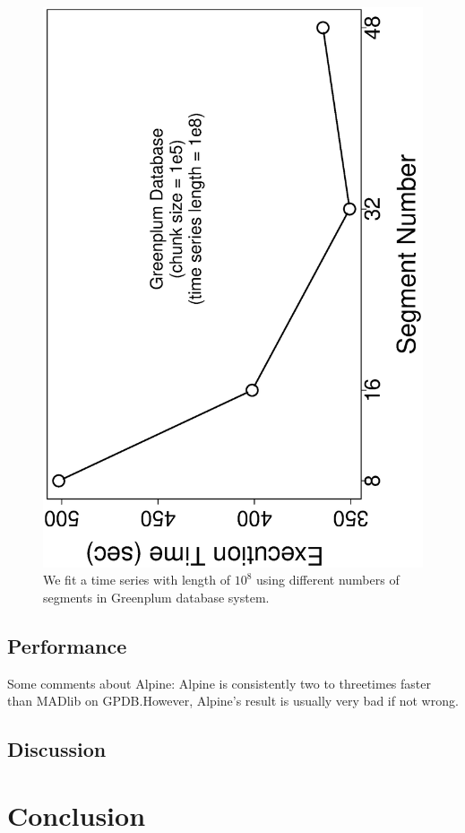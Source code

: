 \documentclass[english,10pt]{llncs}
\begin{document}
\begin{figure}[ht]
  \begin{centering}
    \includegraphics[angle=-90,scale=0.4]{gp_time_vs_seg}
  \end{centering}
  \caption{\label{fig:gp_time_seg} We fit a time series with length of
    $10^8$ using different numbers of segments in Greenplum database
    system.}
\end{figure}

\subsection{Performance}


Some comments about Alpine: Alpine is consistently two to threetimes
faster than MADlib on GPDB.\@ However, Alpine's result is usually very
bad if not wrong.






\subsection{Discussion}


\section{Conclusion}




\end{document}
